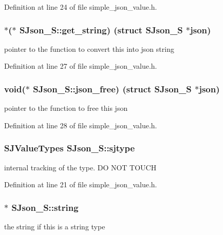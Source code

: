 Definition at line 24 of file simple\+\_\+json\+\_\+value.\+h.

\subsubsection[{\texorpdfstring{get\+\_\+string}{get_string}}]{$\ast$($\ast$ S\+Json\+\_\+\+S\+::get\+\_\+string) (struct {\bf S\+Json\+\_\+S} $\ast$json)}\hypertarget{structSJson__S_afd320740fab795e7063e89157a23c511}{}\label{structSJson__S_afd320740fab795e7063e89157a23c511}
pointer to the function to convert this into json string 

Definition at line 27 of file simple\+\_\+json\+\_\+value.\+h.

\subsubsection[{\texorpdfstring{json\+\_\+free}{json_free}}]{\setlength{\rightskip}{0pt plus 5cm}void($\ast$ S\+Json\+\_\+\+S\+::json\+\_\+free) (struct {\bf S\+Json\+\_\+S} $\ast$json)}\hypertarget{structSJson__S_a8bd24b6b85325a01b8bae6c5899583f2}{}\label{structSJson__S_a8bd24b6b85325a01b8bae6c5899583f2}
pointer to the function to free this json 

Definition at line 28 of file simple\+\_\+json\+\_\+value.\+h.

\subsubsection[{\texorpdfstring{sjtype}{sjtype}}]{\setlength{\rightskip}{0pt plus 5cm}S\+J\+Value\+Types S\+Json\+\_\+\+S\+::sjtype}\hypertarget{structSJson__S_ad68edc13b2a814f9b920498ba439b8ba}{}\label{structSJson__S_ad68edc13b2a814f9b920498ba439b8ba}
internal tracking of the type. DO N\+OT T\+O\+U\+CH 

Definition at line 21 of file simple\+\_\+json\+\_\+value.\+h.

\subsubsection[{\texorpdfstring{string}{string}}]{$\ast$ S\+Json\+\_\+\+S\+::string}\hypertarget{structSJson__S_ab50f7c395b214eb050ff59e3a9bbeb4a}{}\label{structSJson__S_ab50f7c395b214eb050ff59e3a9bbeb4a}
the string if this is a string type 

